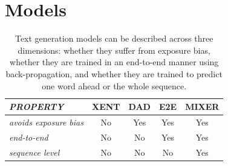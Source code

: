 \section{Models} \label{model}
\begin{table}[t]
	\footnotesize
    \caption{Text generation models can be described across three dimensions: whether they suffer from exposure bias, 
whether they are trained in an end-to-end manner using back-propagation, 
and whether they are trained to predict one word ahead or the whole sequence.}
    \begin{tabular}{l || c | c | c |c}
      \multicolumn{1}{l||}{\em PROPERTY}  & 
      \multicolumn{1}{l|}{XENT} &
      \multicolumn{1}{l|}{DAD} & \multicolumn{1}{c|}{E2E} & \multicolumn{1}{c}{MIXER}\\
      \hline
      \hline
      {\em avoids exposure bias} & No & Yes & Yes & Yes \\
      \hline
      {\em end-to-end} & No & No & Yes & Yes \\
      \hline
      {\em sequence level} & No & No & No & Yes \\
    \end{tabular}
\label{tab:model_comparison}
\end{table}

